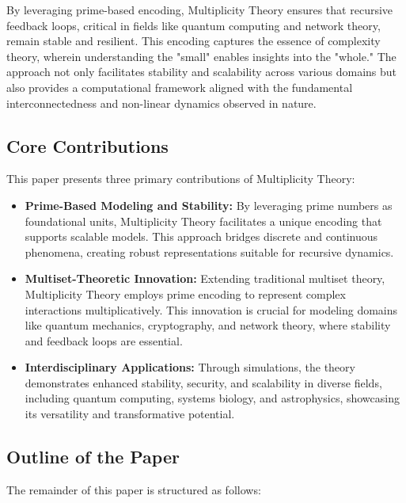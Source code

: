 \documentclass{article}
\theoremstyle{plain}
\begin{document}
By leveraging prime-based encoding, Multiplicity Theory ensures that recursive feedback loops, critical in fields like quantum computing and network theory, remain stable and resilient. This encoding captures the essence of complexity theory, wherein understanding the "small" enables insights into the "whole." The approach not only facilitates stability and scalability across various domains but also provides a computational framework aligned with the fundamental interconnectedness and non-linear dynamics observed in nature.



\subsection{Core Contributions}
This paper presents three primary contributions of Multiplicity Theory:
\begin{itemize}
    \item \textbf{Prime-Based Modeling and Stability:} By leveraging prime numbers as foundational units, Multiplicity Theory facilitates a unique encoding that supports scalable models. This approach bridges discrete and continuous phenomena, creating robust representations suitable for recursive dynamics.
    \item \textbf{Multiset-Theoretic Innovation:} Extending traditional multiset theory, Multiplicity Theory employs prime encoding to represent complex interactions multiplicatively. This innovation is crucial for modeling domains like quantum mechanics, cryptography, and network theory, where stability and feedback loops are essential.
    \item \textbf{Interdisciplinary Applications:} Through simulations, the theory demonstrates enhanced stability, security, and scalability in diverse fields, including quantum computing, systems biology, and astrophysics, showcasing its versatility and transformative potential.
\end{itemize}

\subsection{Outline of the Paper}

The remainder of this paper is structured as follows:
\end{document}

